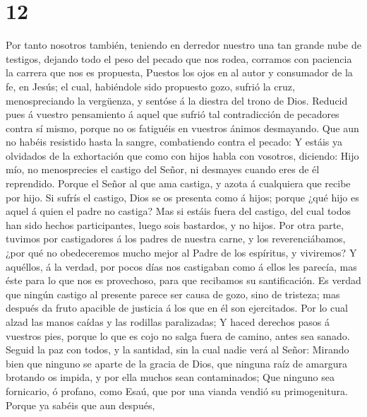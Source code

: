 \hypertarget{section-11}{%
\section{12}\label{section-11}}

 Por tanto nosotros también, teniendo en derredor nuestro
una tan grande nube de testigos, dejando todo el peso del pecado que nos
rodea, corramos con paciencia la carrera que nos es propuesta,
 Puestos los ojos en al autor y consumador de la fe, en
Jesús; el cual, habiéndole sido propuesto gozo, sufrió la cruz,
menospreciando la vergüenza, y sentóse á la diestra del trono de Dios.
 Reducid pues á vuestro pensamiento á aquel que sufrió tal
contradicción de pecadores contra sí mismo, porque no os fatiguéis en
vuestros ánimos desmayando.  Que aun no habéis resistido
hasta la sangre, combatiendo contra el pecado:  Y estáis
ya olvidados de la exhortación que como con hijos habla con vosotros,
diciendo: Hijo mío, no menosprecies el castigo del Señor, ni desmayes
cuando eres de él reprendido.  Porque el Señor al que ama
castiga, y azota á cualquiera que recibe por hijo.  Si
sufrís el castigo, Dios se os presenta como á hijos; porque ¿qué hijo es
aquel á quien el padre no castiga?  Mas si estáis fuera
del castigo, del cual todos han sido hechos participantes, luego sois
bastardos, y no hijos.  Por otra parte, tuvimos por
castigadores á los padres de nuestra carne, y los reverenciábamos, ¿por
qué no obedeceremos mucho mejor al Padre de los espíritus, y viviremos?
 Y aquéllos, á la verdad, por pocos días nos castigaban
como á ellos les parecía, mas éste para lo que nos es provechoso, para
que recibamos su santificación.  Es verdad que ningún
castigo al presente parece ser causa de gozo, sino de tristeza; mas
después da fruto apacible de justicia á los que en él son ejercitados.
 Por lo cual alzad las manos caídas y las rodillas
paralizadas;  Y haced derechos pasos á vuestros pies,
porque lo que es cojo no salga fuera de camino, antes sea sanado.
 Seguid la paz con todos, y la santidad, sin la cual
nadie verá al Señor:  Mirando bien que ninguno se aparte
de la gracia de Dios, que ninguna raíz de amargura brotando os impida, y
por ella muchos sean contaminados;  Que ninguno sea
fornicario, ó profano, como Esaú, que por una vianda vendió su
primogenitura.  Porque ya sabéis que aun después,
